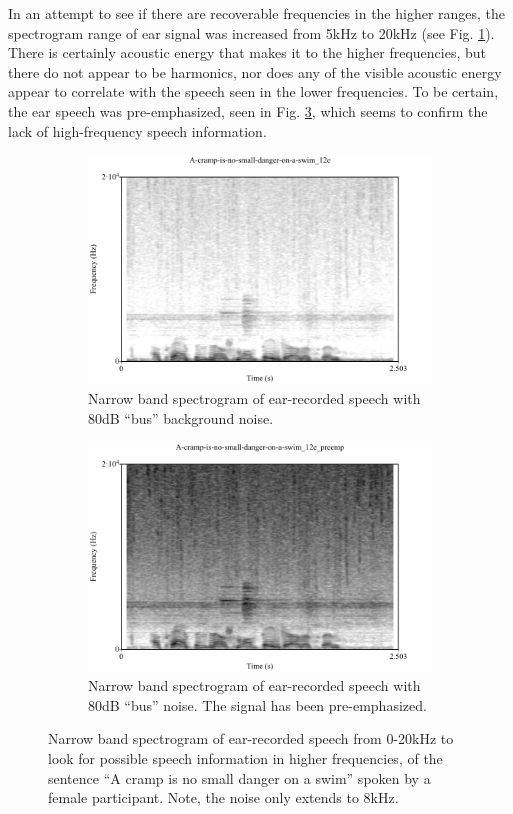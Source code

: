 \documentclass[dissertation,copyright]{uathesis}
\begin{document}
In an attempt to see if there are recoverable frequencies in the higher ranges, the spectrogram range of ear signal was increased from 5kHz to 20kHz (see Fig. \ref{spctgrmEarNarrow20kHz}). There is certainly acoustic energy that makes it to the higher frequencies, but there do not appear to be harmonics, nor does any of the visible acoustic energy appear to correlate with the speech seen in the lower frequencies.
To be certain, the ear speech was pre-emphasized, seen in Fig. \ref{spctgrmNarrowEarNoisePremp_35}, which seems to confirm the lack of high-frequency speech information. 
\begin{figure}
\centering
\begin{subfigure}{0.475\textwidth}
  \centering
  \includegraphics[width=1\linewidth]{figure/spctgrmEarNarrow20kHz.pdf}
  \caption{Narrow band spectrogram of ear-recorded speech with 80dB ``bus'' background noise.}
  \label{spctgrmEarNarrow20kHz}
\end{subfigure}%
\hfill
\begin{subfigure}{0.475\textwidth}
  \centering
  \includegraphics[width=1\linewidth]{figure/spctgrmNarrowEarNoisePremp.pdf}
  \caption{Narrow band spectrogram of ear-recorded speech with 80dB ``bus'' noise.  The signal has been pre-emphasized.}
  \label{spctgrmNarrowEarNoisePremp_35}
\end{subfigure}
\caption{Narrow band spectrogram of ear-recorded speech from 0-20kHz to look for possible speech information in higher frequencies, of the sentence ``A cramp is no small danger on a swim'' spoken by a female participant. Note, the noise only extends to 8kHz.}
\end{figure}
\end{document}
